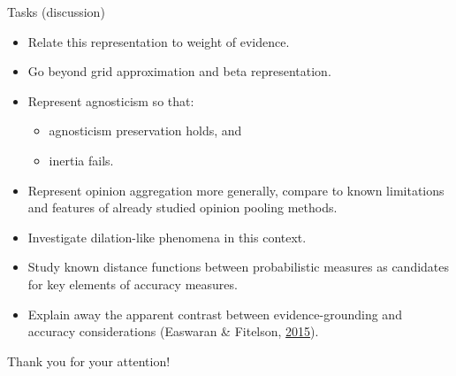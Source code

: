 \documentclass[10pt,ignorenonframetext,x11names, dvipsnames, bibspacing,natbib]{beamer}
\providecommand{\tightlist}{%
  \setlength{\itemsep}{0pt}\setlength{\parskip}{0pt}}
\begin{document}
\begin{frame}{Tasks (discussion)}

\footnotesize 

\begin{itemize}
\tightlist
\item
  Relate this representation to weight of evidence.
\end{itemize}

\vspace{-2mm}

\begin{itemize}
\item
  Go beyond grid approximation and beta representation.
\item
  Represent agnosticism so that:

  \begin{itemize}
  \item
    agnosticism preservation holds, and
  \item
    inertia fails.
  \end{itemize}
\end{itemize}

\vspace{-2mm}

\begin{itemize}
\tightlist
\item
  Represent opinion aggregation more generally, compare to known
  limitations and features of already studied opinion pooling methods.
\end{itemize}

\vspace{-2mm}

\begin{itemize}
\tightlist
\item
  Investigate dilation-like phenomena in this context.
\end{itemize}

\vspace{-2mm}

\begin{itemize}
\tightlist
\item
  Study known distance functions between probabilistic measures as
  candidates for key elements of accuracy measures.
\end{itemize}

\vspace{-2mm}

\begin{itemize}
\tightlist
\item
  Explain away the apparent contrast between evidence-grounding and
  accuracy considerations (Easwaran \& Fitelson,
  \protect\hyperlink{ref-easwaranAndFitelson2015}{2015}).
\end{itemize}

\begin{center}
\Large Thank you for your attention!
\end{center}

\end{frame}
\end{document}
